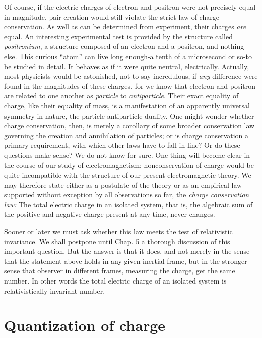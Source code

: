 Of course, if the electric charges of electron and positron
were not precisely equal in magnitude, pair creation would still violate the
strict law of charge conservation. As well as can be determined from
experiment, their charges \emph{are} equal. An interesting experimental test is
provided by the structure called \emph{positronium}, a structure composed of an
electron and a positron, and nothing else. This curious ``atom'' can live long
enough-a tenth of a microsecond or so-to be studied in detail. It behaves as if
it were quite neutral, electrically. Actually, most physicists would be
astonished, not to say incredulous, if \emph{any} difference were found in the
magnitudes of these charges, for we know that electron and positron are related
to one another as \emph{particle} to \emph{antiparticle}. Their exact equality
of charge, like their equality of mass, is a manifestation of an apparently
universal symmetry in nature, the particle-antiparticle duality. One might
wonder whether charge conservation, then, is merely a corollary of some broader
conservation law governing the creation and annihilation of particles; or is
charge conservation a primary requirement, with which other laws have to fall
in line? Or do these questions make sense? We do not know for sure. 
One thing will become clear in the course of our study of
electromagnetism: nonconservation of charge would be quite incompatible with
the structure of our present electromagnetic theory. We may therefore state
either as a postulate of the theory or as an empirical law supported without
exception by all observations so far, the \emph{charge conservation law:}
The total electric charge in an isolated system, that is, the
algebraic sum of the positive and negative charge present at any time, never
changes. 

Sooner or later we must ask whether this law meets the test
of relativistic invariance. We shall postpone until Chap. 5 a thorough
discussion of this important question. But the answer is that it does, and not
merely in the sense that the statement above holds in any given inertial frame,
but in the stronger sense that observer in different frames, measuring the
charge, get the same number. In other words the total electric charge of an
isolated system is relativistically invariant number. 

\section{Quantization of charge} 

